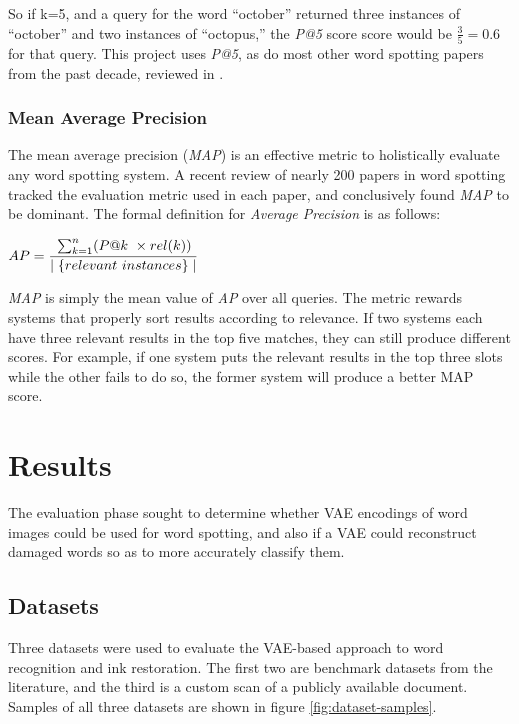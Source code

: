 \documentclass[final]{ukthesis}
\begin{document}
So if k=5, and a query for the word ``october'' returned three instances of ``october'' and two instances of ``octopus,'' the {\em P@5} score score would be \begin{math}\frac{3}{5} = 0.6\end{math} for that query. This project uses {\em P@5}, as do most other word spotting papers from the past decade, reviewed in \cite{giotis2017survey}.


\subsection{Mean Average Precision}
The mean average precision ({\em MAP}) is an effective metric to holistically evaluate any word spotting system. A recent review \cite{giotis2017survey} of nearly 200 papers in word spotting tracked the evaluation metric used in each paper, and conclusively found {\em MAP} to be dominant. The formal definition for {\em Average Precision} is as follows:

\begin{center}
\begin{math}
{AP}=\cfrac{\sum_{k=1}^n (P@k\ \times rel(k))}{\mid\{relevant \ instances\}\mid}
\end{math}
\end{center}

{\em MAP} is simply the mean value of {\em AP} over all queries. The metric rewards systems that properly sort results according to relevance. If two systems each have three relevant results in the top five matches, they can still produce different scores. For example, if one system puts the relevant results in the top three slots while the other fails to do so, the former system will produce a better MAP score.


%
%
%
\chapter{Results}
The evaluation phase sought to determine whether VAE encodings of word images could be used for word spotting, and also if a VAE could reconstruct damaged words so as to more accurately classify them.

%
%
\section{Datasets}
Three datasets were used to evaluate the VAE-based approach to word recognition and ink restoration. The first two are benchmark datasets from the literature, and the third is a custom scan of a publicly available document. Samples of all three datasets are shown in figure \ref{fig:dataset-samples}.
\end{document}
